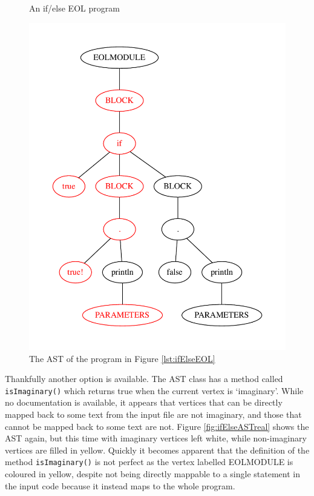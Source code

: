 \begin{figure}
\centering
\begin{minipage}[b]{.44\textwidth}
  \centering
  
  \caption{An if/else EOL program}
  \label{lst:ifElseEOL}
\end{minipage}%
\begin{minipage}[b]{.1\textwidth}
\hspace{3.00mm}
\end{minipage}
\begin{minipage}[b]{.44\textwidth}
  \centering
  \includegraphics[scale=0.5]{figures/ifElseAST.pdf}
  \caption{The AST of the program in Figure \ref{lst:ifElseEOL}}
  \label{fig:ifElseAST}
\end{minipage}
\end{figure}

Thankfully another option is available. The AST class has a method called \verb|isImaginary()| which returns true when the current vertex is `imaginary'. While no documentation is available, it appears that vertices that can be directly mapped back to some text from the input file are not imaginary, and those that cannot be mapped back to some text are not. Figure \ref{fig:ifElseASTreal} shows the AST again, but this time with imaginary vertices left white, while non-imaginary vertices are filled in yellow. Quickly it becomes apparent that the definition of the method \verb+isImaginary()+ is not perfect as the vertex labelled EOLMODULE is coloured in yellow, despite not being directly mappable to a single statement in the input code because it instead maps to the whole program.

